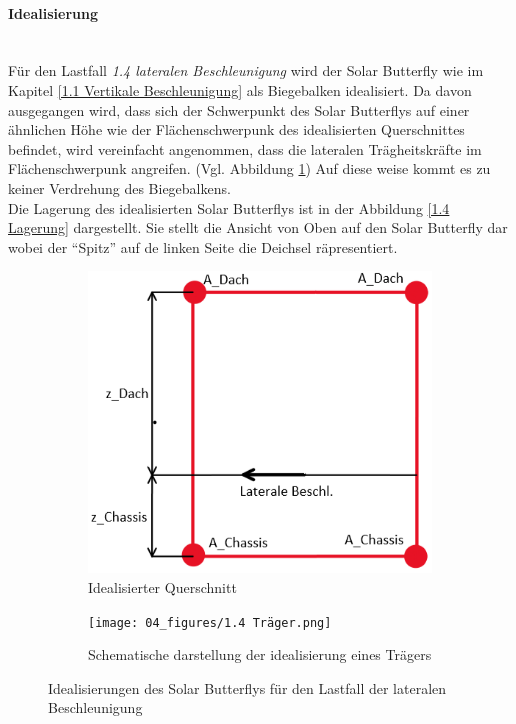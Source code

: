   \paragraph{Idealisierung}\mbox{}\\
  Für den Lastfall \emph{1.4 lateralen Beschleunigung} wird der Solar Butterfly wie im Kapitel \ref{1.1 Vertikale Beschleunigung} als Biegebalken idealisiert. Da davon ausgegangen wird, dass sich der Schwerpunkt des Solar Butterflys auf einer ähnlichen Höhe wie der Flächenschwerpunk des idealisierten Querschnittes befindet, wird vereinfacht angenommen, dass die lateralen Trägheitskräfte im Flächenschwerpunk angreifen. (Vgl. Abbildung \ref{1.4 Idealisierter Querschnitt}) Auf diese weise kommt es zu keiner Verdrehung des Biegebalkens.\\
  Die Lagerung des idealisierten Solar Butterflys ist in der Abbildung \ref{1.4 Lagerung} dargestellt. Sie stellt die Ansicht von Oben auf den Solar Butterfly dar wobei der ``Spitz'' auf de linken Seite die Deichsel räpresentiert.

  \begin{figure}[!ht]
    \centering
      \begin{subfigure}{.5\textwidth}
        \centering
        \includegraphics[width=0.8\linewidth]{04_figures/1.4 Querschnitt.png}
        \caption{Idealisierter Querschnitt}
        \label{1.4 Idealisierter Querschnitt}
      \end{subfigure}%
      \begin{subfigure}{.5\textwidth}
        \centering
        \texttt{[image: 04\_figures/1.4 Träger.png]}
        \caption{Schematische darstellung der idealisierung eines Trägers}
        \label{1.4 Träger}
      \end{subfigure}%
    \caption{Idealisierungen des Solar Butterflys für den Lastfall der lateralen Beschleunigung}
  \label{1.4 Idealisierung}
  \end{figure}

